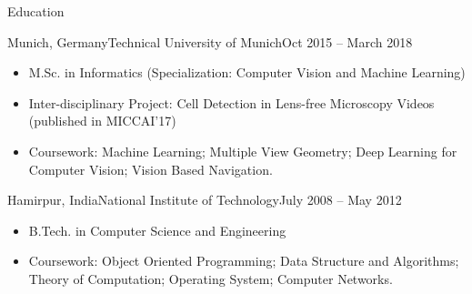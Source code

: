 \documentclass[]{mcdowellcv}
\begin{document}
	
	\makeheader
	
	\begin{cvsection}{Education}
		\begin{cvsubsection}{Munich, Germany}{Technical University of Munich}{Oct 2015 -- March 2018}
			\begin{itemize}
				\item M.Sc. in Informatics (Specialization: Computer Vision and Machine Learning)
				\item Inter-disciplinary Project: Cell Detection in Lens-free Microscopy Videos (published in MICCAI'17) \cite{rempfler-2017}
				\item Coursework: Machine Learning; Multiple View Geometry; Deep Learning for Computer Vision; Vision Based Navigation.
			\end{itemize}
		\end{cvsubsection}
		\begin{cvsubsection}{Hamirpur, India}{National Institute of Technology}{July 2008 -- May 2012}
			\begin{itemize}
				\item B.Tech. in Computer Science and Engineering
				\item Coursework: Object Oriented Programming; Data Structure and Algorithms; Theory of Computation; Operating System; Computer Networks.
			\end{itemize}
		\end{cvsubsection}
	\end{cvsection}
	
\end{document}
